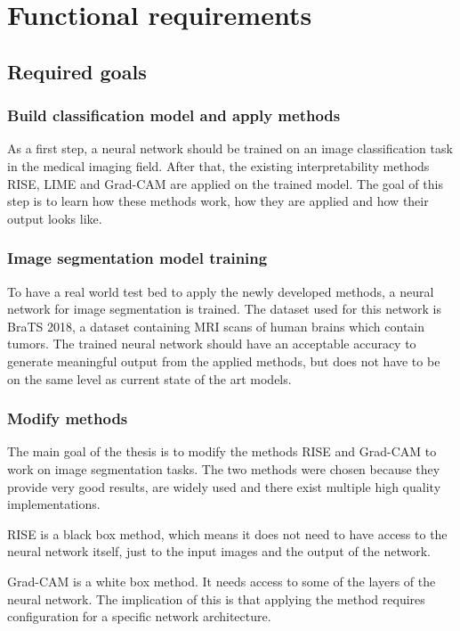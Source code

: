 \section{Functional requirements}
\subsection{Required goals}

\subsubsection{Build classification model and apply methods}
As a first step, a neural network should be trained on an image classification task in the medical imaging field.
After that, the existing interpretability methods RISE, LIME and Grad-CAM are applied on the trained model.
The goal of this step is to learn how these methods work, how they are applied and how their output looks like.

\subsubsection{Image segmentation model training}
To have a real world test bed to apply the newly developed methods, a neural network for image segmentation is trained.
The dataset used for this network is BraTS 2018, a dataset containing MRI scans of human brains which contain tumors.
The trained neural network should have an acceptable accuracy to generate meaningful output from the applied methods, but
does not have to be on the same level as current state of the art models. 

\subsubsection{Modify methods}
The main goal of the thesis is to modify the methods RISE and Grad-CAM to work on image segmentation tasks.
The two methods were chosen because they provide very good results, are widely used and there exist multiple high
quality implementations.

RISE is a black box method, which means it does not need to have access to the neural network itself,
just to the input images and the output of the network.

Grad-CAM is a white box method. It needs access to some of the layers of the neural network. The implication of this
is that applying the method requires configuration for a specific network architecture.

